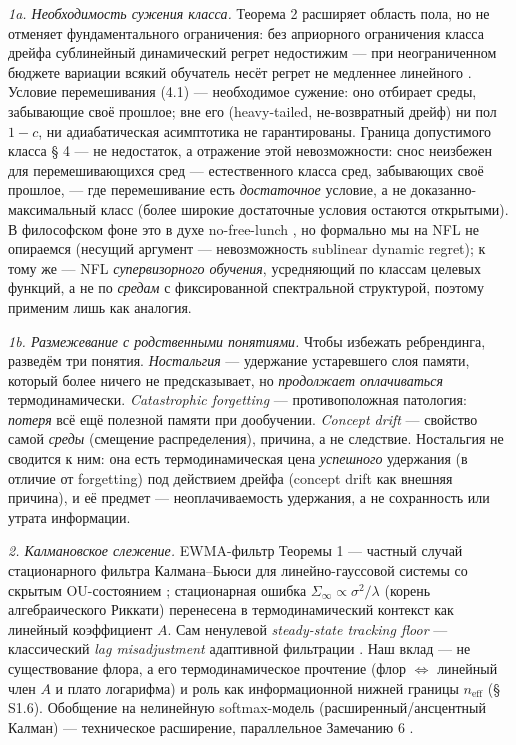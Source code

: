 \documentclass[12pt]{iopart}
\begin{document}
\emph{1a. Необходимость сужения класса.} Теорема 2 расширяет область пола, но не отменяет фундаментального ограничения: без априорного ограничения класса дрейфа сублинейный динамический регрет недостижим --- при неограниченном бюджете вариации всякий обучатель несёт регрет не медленнее линейного \cite{BesbesGurZeevi2015,Zinkevich2003}. Условие перемешивания (4.1) --- необходимое сужение: оно отбирает среды, забывающие своё прошлое; вне его (heavy-tailed, не-возвратный дрейф) ни пол \(1-c\), ни адиабатическая асимптотика не гарантированы. Граница допустимого класса § 4 --- не недостаток, а отражение этой невозможности: снос неизбежен для перемешивающихся сред --- естественного класса сред, забывающих своё прошлое, --- где перемешивание есть \emph{достаточное} условие, а не доказанно-максимальный класс (более широкие достаточные условия остаются открытыми). В философском фоне это в духе no-free-lunch \cite{Wolpert1996}, но формально мы на NFL не опираемся (несущий аргумент --- невозможность sublinear dynamic regret); к тому же \cite{Wolpert1996} --- NFL \emph{супервизорного обучения}, усредняющий по классам целевых функций, а не по \emph{средам} с фиксированной спектральной структурой, поэтому применим лишь как аналогия.



\emph{1b. Размежевание с родственными понятиями.} Чтобы избежать ребрендинга, разведём три понятия. \emph{Ностальгия} --- удержание устаревшего слоя памяти, который более ничего не предсказывает, но \emph{продолжает оплачиваться} термодинамически. \emph{Catastrophic forgetting} \cite{McCloskeyCohen1989,Kirkpatrick2017} --- противоположная патология: \emph{потеря} всё ещё полезной памяти при дообучении. \emph{Concept drift} \cite{Gama2014} --- свойство самой \emph{среды} (смещение распределения), причина, а не следствие. Ностальгия не сводится к ним: она есть термодинамическая цена \emph{успешного} удержания (в отличие от forgetting) под действием дрейфа (concept drift как внешняя причина), и её предмет --- неоплачиваемость удержания, а не сохранность или утрата информации.



\emph{2. Калмановское слежение.} EWMA-фильтр Теоремы 1 --- частный случай стационарного фильтра Калмана--Бьюси для линейно-гауссовой системы со скрытым OU-состоянием \cite{KalmanBucy1961,AndersonMoore1979}; стационарная ошибка \(\Sigma_\infty \propto \sigma^2/\lambda\) (корень алгебраического Риккати) перенесена в термодинамический контекст как линейный коэффициент \(A\). Сам ненулевой \emph{steady-state tracking floor} --- классический \emph{lag misadjustment} адаптивной фильтрации \cite{Widrow1976,Haykin2014}. Наш вклад --- не существование флора, а его термодинамическое прочтение (флор \(\Leftrightarrow\) линейный член \(A\) и плато логарифма) и роль как информационной нижней границы \(n_{\text{eff}}\) (§ S1.6). Обобщение на нелинейную softmax-модель (расширенный/ансцентный Калман) --- техническое расширение, параллельное Замечанию 6 \cite{Andriishin2026b}.
\end{document}
